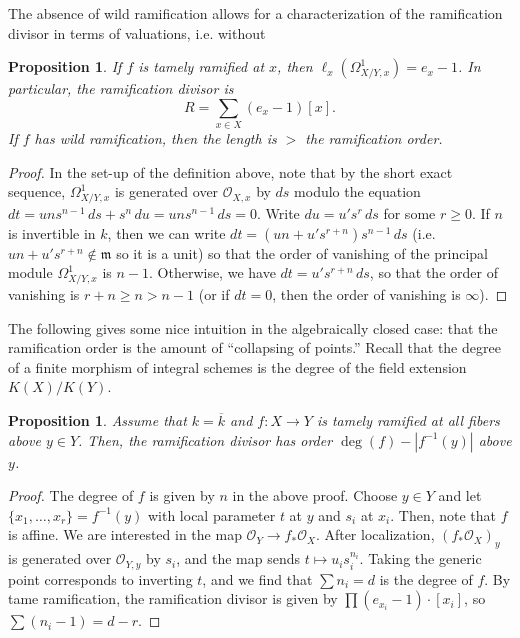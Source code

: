 \documentclass[10pt]{article}
\newtheorem{prop}[thm]{Proposition}
\theoremstyle{definition}
\newcommand{\mf}{\mathfrak}
\newcommand{\OO}{\mathcal{O}}
\begin{document}
The absence of wild ramification allows for a characterization of the ramification divisor in terms of valuations, i.e. without 
\begin{prop}
If $f$ is tamely ramified at $x$, then $\ell_x(\Omega^1_{X/Y,x}) = e_x - 1$.  In particular, the ramification divisor is
$$R = \sum_{x \in X} (e_x - 1) [x].$$ 
If $f$ has wild ramification, then the length is $>$ the ramification order.
\end{prop}
\begin{proof}
In the set-up of the definition above, note that by the short exact sequence, $\Omega^1_{X/Y, x}$ is generated over $\OO_{X, x}$ by $ds$ modulo the equation $dt = uns^{n-1} \, ds + s^n \, du = uns^{n-1} \, ds = 0$.  Write $du = u' s^r \, ds$ for some $r \geq 0$.  If $n$ is invertible in $k$, then we can write $dt = (un + u' s^{r+n}) s^{n-1} \, ds$ (i.e. $un + u's^{r+n} \not\in \mf{m}$ so it is a unit) so that the order of vanishing of the principal module $\Omega^1_{X/Y, x}$ is $n-1$.  Otherwise, we have $dt = u' s^{r+n} \, ds$, so that the order of vanishing is $r+n \geq n > n-1$ (or if $dt = 0$, then the order of vanishing is $\infty$).
\end{proof}


The following gives some nice intuition in the algebraically closed case: that the ramification order is the amount of ``collapsing of points.''  Recall that the degree of a finite morphism of integral schemes is the degree of the field extension $K(X)/K(Y)$.
\begin{prop}
Assume that $k = \overline{k}$ and $f: X \rightarrow Y$ is tamely ramified at all fibers above $y \in Y$.  Then, the ramification divisor has order $\deg(f) - |f^{-1}(y)|$ above $y$.
\end{prop}
\begin{proof}
The degree of $f$ is given by $n$ in the above proof.  Choose $y \in Y$ and let $\{x_1, \ldots, x_r\} = f^{-1}(y)$ with local parameter $t$ at $y$ and $s_i$ at $x_i$.  Then, note that $f$ is affine.  We are interested in the map $\OO_Y \rightarrow f_* \OO_X$.  After localization, $(f_* \OO_X)_y$ is generated over $\OO_{Y, y}$ by $s_i$, and the map sends $t \mapsto u_i s_i^{n_i}$.  Taking the generic point corresponds to inverting $t$, and we find that $\sum n_i = d$ is the degree of $f$.  By tame ramification, the ramification divisor is given by $\prod (e_{x_i}- 1) \cdot [x_i]$, so $\sum (n_i - 1) = d - r$.
\end{proof}
\end{document}
